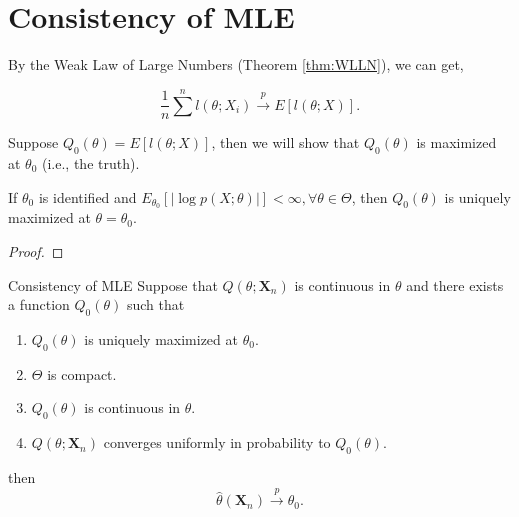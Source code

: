 \section{Consistency of MLE}

By the Weak Law of Large Numbers (Theorem \ref{thm:WLLN}), we can get,

\begin{equation}
    \frac{1}{n}\sum^{n}l\left(\theta;X_{i}\right)\stackrel{p}{\rightarrow}E\left[l(\theta;X)\right].
\end{equation}

Suppose $Q_{0}(\theta)=E\left[l(\theta;X)\right]$, then we will show that $Q_{0}(\theta)$ is maximized at $\theta_{0}$ (i.e., the truth).

\begin{lemma}{}{}
    If $\theta_{0}$ is identified and $E_{\theta_{0}}\left[|\log p(X;\theta)|\right]<\infty,\forall\theta\in\Theta$, then $Q_{0}(\theta)$ is uniquely maximized at $\theta=\theta_{0}$.
\end{lemma}

\begin{proof}
    
\end{proof}

\begin{theorem}{Consistency of MLE}{}
    Suppose that $Q\left(\theta;\textbf{X}_{n}\right)$ is continuous in $\theta$ and there exists a function $Q_{0}(\theta)$ such that
    \begin{enumerate}
        \item $Q_{0}(\theta)$ is uniquely maximized at $\theta_{0}$.
        \item $\Theta$ is compact.
        \item $Q_{0}(\theta)$ is continuous in $\theta$.
        \item $Q\left(\theta;\textbf{X}_{n}\right)$ converges uniformly in probability to $Q_{0}(\theta)$.
    \end{enumerate}
    then
    \begin{equation}
        \hat{\theta}\left(\textbf{X}_{n}\right)\stackrel{p}{\rightarrow}\theta_{0}.
    \end{equation}
\end{theorem}

